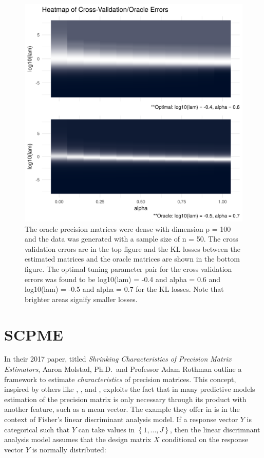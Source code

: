 \documentclass[11pt,]{report}
\theoremstyle{definition}
\theoremstyle{definition}
\theoremstyle{definition}
\theoremstyle{remark}
\begin{document}
\begin{figure}

{\centering \includegraphics[width=0.85\linewidth,]{images/repsKLdenseQR_N50_P100} 

}

\caption{The oracle precision matrices were dense with dimension p = 100 and the data was generated with a sample size of n = 50. The cross validation errors are in the top figure and the KL losses between the estimated matrices and the oracle matrices are shown in the bottom figure. The optimal tuning parameter pair for the cross validation errors was found to be log10(lam) = -0.4 and alpha = 0.6 and log10(lam) = -0.5 and alpha = 0.7 for the KL losses. Note that brighter areas signify smaller losses.}\label{fig:admmsim3}
\end{figure}

\hypertarget{scpme}{%
\chapter{SCPME}\label{scpme}}

In their 2017 paper, titled \emph{Shrinking Characteristics of Precision Matrix Estimators}, Aaron Molstad, Ph.D.~and Professor Adam Rothman outline a framework to estimate \emph{characteristics} of precision matrices. This concept, inspired by others like \citet{cai2011direct}, \citet{fan2012road}, and \citet{mai2012direct}, exploits the fact that in many predictive models estimation of the precision matrix is only necessary through its product with another feature, such as a mean vector. The example they offer in \citet{molstad2017shrinking} is in the context of Fisher's linear discriminant analysis model. If a response vector \(Y\) is categorical such that \(Y\) can take values in \(\left\{1, ..., J\right\}\), then the linear discrimnant analysis model assumes that the design matrix \(X\) conditional on the response vector \(Y\) is normally distributed:
\end{document}
